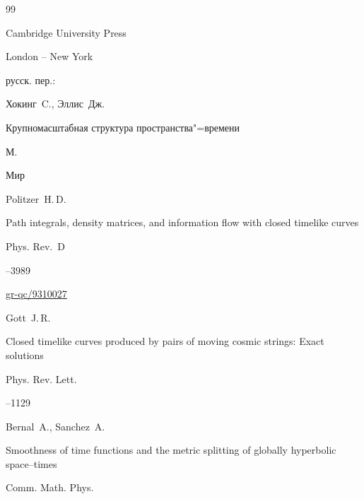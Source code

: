 \begin{thebibliography}{99}

\publ Cambridge University Press

\publaddr London -- New York



\rtransl русск. пер.:~

\by Хокинг~C., Эллис~Дж.

\book Крупномасштабная структура пространства"=времени

\publaddr М.

\publ Мир






\by Politzer~H.\,D.

\paper Path integrals, density matrices, and information flow with closed timelike curves

\jour Phys. Rev.~D




–3989

\arxiv \href{http://arxiv.org/abs/gr-qc/9310027}{gr-qc/9310027} 







\by Gott~J.\,R.

\paper Closed timelike curves produced by pairs of moving cosmic strings: Exact solutions

\jour Phys. Rev. Lett.




–1129




\by Bernal~A., Sanchez~A.

\paper Smoothness of time functions and the metric splitting of globally hyperbolic space--times

\jour Comm. Math. Phys.





\end{thebibliography}
